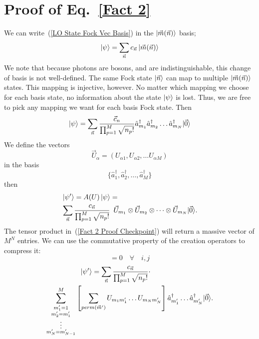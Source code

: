 \documentclass[aps,pra,twocolumn,showpacs,superscriptaddress,floatfix,10pt]{revtex4}
\begin{document}
\section{Proof of Eq.~\ref{Fact 2}}
\label{Proof of Fact 2}
We can write~(\ref{LO State Fock Vec Basis}) in the $\ket{\vec{m}(\vec{n})}$ basis;
\begin{equation}
\ket{\psi} = \sum_{\vec{n}} c_{\vec{n}} \ket{\vec{m}(\vec{n})}
\end{equation}
We note that because photons are bosons, and are indistinguishable, this change of basis is not well-defined. The same Fock state $\ket{\vec{n}}$ can map to multiple $\ket{\vec{m}(\vec{n})}$ states. This mapping is injective, however. No matter which mapping we choose for each basis state, no information about the state $\ket{\psi}$ is lost. Thus, we are free to pick any mapping we want for each basis Fock state. Then
\begin{equation}
\ket{\psi} = \sum_{\vec{n}} \frac{\vec{c}_n}{\prod_{p=1}^{M} \sqrt{n_p !}} \hat{a}_{m_1}^\dagger \hat{a}_{m_2}^\dagger \dots \hat{a}_{m_N}^\dagger |\vec{0} \rangle
\end{equation}
We define the vectors
\begin{equation}
\vec{U}_\alpha = (U_{\alpha 1},U_{\alpha 2},\dots U_{\alpha M})
\end{equation}
in the basis
\begin{equation}
\{ \hat{a}_{1}^\dagger,\hat{a}_{2}^\dagger, \dots, \hat{a}_{M}^\dagger \}
\end{equation}
then
\begin{eqnarray}
\label{Fact 2 Proof Checkpoint}
& \ket{\psi^\prime} = A(U) \ket{\psi} =  \quad \quad \quad \quad \quad \quad \quad \quad \quad \quad \\ & \nonumber
\sum_{\vec{n}} \frac{c_{\vec{n}}}{\prod_{p=1}^{M} \sqrt{n_p !}} \enspace \vec{U}_{m_1} \otimes \vec{U}_{m_2} \otimes \dots \otimes \vec{U}_{m_N} |\vec{0} \rangle.
\end{eqnarray}
The tensor product in~(\ref{Fact 2 Proof Checkpoint}) will return a massive vector of $M^N$ entries. We can use the commutative property of the creation operators to compress it:
\begin{equation}
[\hat{a}_i ^ \dagger,\hat{a}_j ^ \dagger] = 0 \quad \forall \quad i,j
\end{equation}
\begin{eqnarray}
 \ket{\psi^\prime} = \sum_{\vec{n}} \frac{c_{\vec{n}}}{\prod_{p=1}^{M} \sqrt{n_p !}} \cdot \quad \quad \quad \quad \quad \quad \quad \quad \quad \\  \nonumber \sum^M_{\substack{m_1^\prime = 1\\
		m_2^\prime = m_1^\prime\\
		\vdots \\
		m_N^\prime = m_{N-1}^\prime}}
\left[ \sum_{perm(\vec{m}^\prime)} U_{m_1 m_1^\prime} \dots U_{m_N m_N^\prime} \right] \hat{a}_{m_1^\prime}^\dagger \dots \hat{a}_{m_N^\prime}^\dagger |\vec{0} \rangle.
\end{eqnarray}
\end{document}

